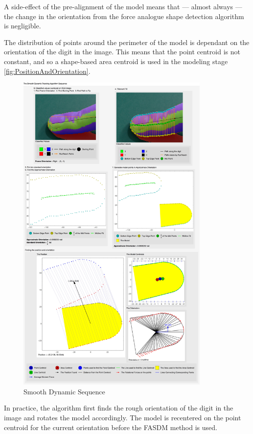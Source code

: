 A side-effect of the pre-alignment of the model means that --- almost always --- the change in the orientation from the force analogue shape detection algorithm is negligible.

The distribution of points around the perimeter of the model is dependant on the orientation of the digit in the image. This means that the point centroid is not constant, and so a shape-based area centroid is used in the modeling stage \ref{fig:PositionAndOrientation}. 

\begin{figure}[h!]
  \centering
    \includegraphics[width=0.85\textwidth]{Chapter4/Figs/Smooth_Dynamic_Sequence.jpg}
    \caption{Smooth Dynamic Sequence}\label{fig:SmoothDynamicSequence}
\end{figure}


In practice, the algorithm first finds the rough orientation of the digit in the image and rotates the model accordingly. The model is recentered on the point centroid for the current orientation before the FASDM method is used. 

